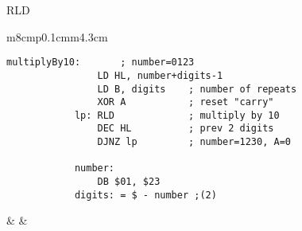 \documentclass[12pt,twoside,openright,a4paper]{book}
\begin{document}
\begin{basedescript}{
	\desclabelstyle{\multilinelabel}
	\desclabelwidth{3cm}}
\begin{DetailItem}{RLD}
		\begin{tabular}{m{8cm}p{0.1cm}m{4.3cm}}

			\begin{lstlisting}[autogobble=true]
			multiplyBy10:		; number=0123
				LD HL, number+digits-1
				LD B, digits	; number of repeats
				XOR A			; reset "carry"
			lp:	RLD				; multiply by 10 
				DEC HL			; prev 2 digits
				DJNZ lp			; number=1230, A=0

			number:
				DB $01, $23
			digits: = $ - number ;(2)
			\end{lstlisting}
	
			& &
   	
			\newcommand{\HLindicator}[2]{
				\path (progress-#1-2.south west) --
					node[xshift=#2, yshift=1.4ex, rotate=90]{$\lbrace$}
					node[xshift=#2 + 0.1ex, yshift=0.2ex, indicator]{(HL)} (progress-#1-2.south)
			}
	
			\newcommand{\ByteIndicator}[1]{
				\draw 
					(progress-#1-2.west) ++(8.5pt,9pt) 
					|- ++(5pt,-3pt) -| ++(6pt,3pt) 
					++(1pt,0) 
					|- ++(5pt,-3pt) -| ++(6pt,3pt);
			}
	
\end{tabular}
\end{DetailItem}
\end{basedescript}
\end{document}
